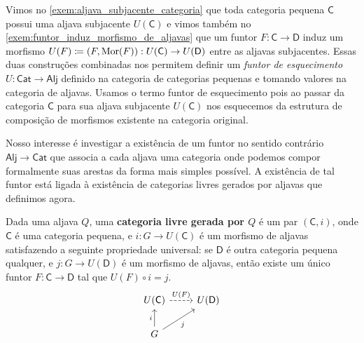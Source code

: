 \begin{exem}\label{exem:funtor_esquecimento_cat_aljava}
    Vimos no \cref{exem:aljava_subjacente_categoria} que toda categoria pequena $\mathsf{C}$ possui uma aljava subjacente $U(\mathsf{C})$ e vimos também no \cref{exem:funtor_induz_morfismo_de_aljavas} que um funtor $F: \mathsf{C} \to \mathsf{D}$ induz um morfismo $U(F) \coloneqq (F,\mathrm{Mor}(F)): U(\mathsf{C}) \to U(\mathsf{D})$ entre as aljavas subjacentes.
    Essas duas construções combinadas nos permitem definir um \emph{funtor de esquecimento} $U: \mathsf{Cat} \to \mathsf{Alj}$ definido na categoria de categorias pequenas e tomando valores na categoria de aljavas.
    Usamos o termo funtor de esquecimento pois ao passar da categoria $\mathsf{C}$ para sua aljava subjacente $U(\mathsf{C})$ nos esquecemos da estrutura de composição de morfismos existente na categoria original.
\end{exem}

Nosso interesse é investigar a existência de um funtor no sentido contrário $\mathsf{Alj} \to \mathsf{Cat}$ que associa a cada aljava uma categoria onde podemos compor formalmente suas arestas da forma mais simples possível.
A existência de tal funtor está ligada à existência de categorias livres gerados por aljavas que definimos agora.

\begin{defin}\label{defin:categoria_livre}
    Dada uma aljava $Q$, uma \textbf{categoria livre gerada por $Q$} é um par $(\mathsf{C},i)$, onde $\mathsf{C}$ é uma categoria pequena, e $i: G \to U(\mathsf{C})$ é um morfismo de aljavas satisfazendo a seguinte propriedade universal: se $\mathsf{D}$ é outra categoria pequena qualquer, e $j: G \to U(\mathsf{D})$ é um morfismo de aljavas, então existe um único funtor $F: \mathsf{C} \to \mathsf{D}$ tal que $U(F) \circ i = j$.
    \begin{displaymath}
        \begin{tikzcd}
            U(\mathsf{C})
            \arrow[r, dashed, "U(F)"]
            & U(\mathsf{D})
            \\ G
            \arrow[u, "i"]
            \arrow[ru, "j" swap]
        \end{tikzcd}
    \end{displaymath}
\end{defin}

